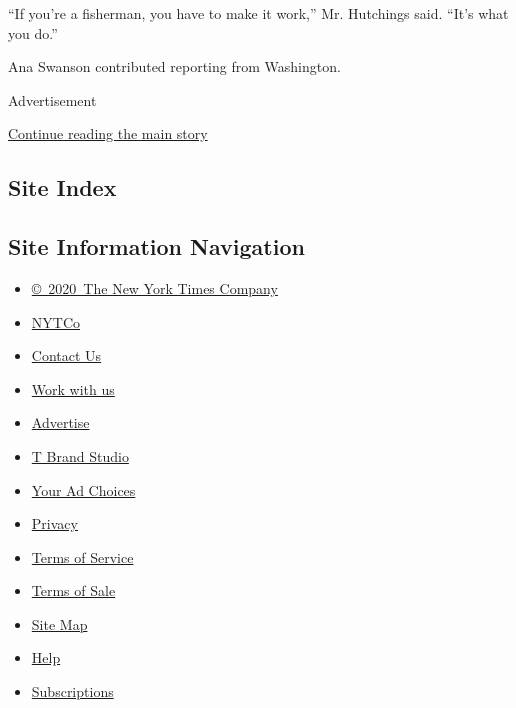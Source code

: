 ``If you're a fisherman, you have to make it work,'' Mr. Hutchings said.
``It's what you do.''

Ana Swanson contributed reporting from Washington.

Advertisement

\protect\hyperlink{after-bottom}{Continue reading the main story}

\hypertarget{site-index}{%
\subsection{Site Index}\label{site-index}}

\hypertarget{site-information-navigation}{%
\subsection{Site Information
Navigation}\label{site-information-navigation}}

\begin{itemize}
\tightlist
\item
  \href{https://help.nytimes.com/hc/en-us/articles/115014792127-Copyright-notice}{©~2020~The
  New York Times Company}
\end{itemize}

\begin{itemize}
\tightlist
\item
  \href{https://www.nytco.com/}{NYTCo}
\item
  \href{https://help.nytimes.com/hc/en-us/articles/115015385887-Contact-Us}{Contact
  Us}
\item
  \href{https://www.nytco.com/careers/}{Work with us}
\item
  \href{https://nytmediakit.com/}{Advertise}
\item
  \href{http://www.tbrandstudio.com/}{T Brand Studio}
\item
  \href{https://www.nytimes.com/privacy/cookie-policy\#how-do-i-manage-trackers}{Your
  Ad Choices}
\item
  \href{https://www.nytimes.com/privacy}{Privacy}
\item
  \href{https://help.nytimes.com/hc/en-us/articles/115014893428-Terms-of-service}{Terms
  of Service}
\item
  \href{https://help.nytimes.com/hc/en-us/articles/115014893968-Terms-of-sale}{Terms
  of Sale}
\item
  \href{https://spiderbites.nytimes.com}{Site Map}
\item
  \href{https://help.nytimes.com/hc/en-us}{Help}
\item
  \href{https://www.nytimes.com/subscription?campaignId=37WXW}{Subscriptions}
\end{itemize}
